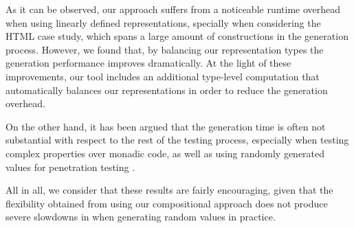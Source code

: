 As it can be observed, our approach suffers from a noticeable runtime overhead
when using linearly defined representations, specially when considering the HTML
case study, which spans a large amount of constructions in the generation
process.
%
However, we found that, by balancing our representation types the generation
performance improves dramatically.
%
At the light of these improvements, our tool includes an additional type-level
computation that automatically balances our representations in order to reduce
the generation overhead.


On the other hand, it has been argued that the generation time is often not
substantial with respect to the rest of the testing process, especially when
testing complex properties over monadic code, as well as using randomly
generated values for penetration testing
\cite{DBLP:conf/haskell/MistaRH18,grieco2017}.


All in all, we consider that these results are fairly encouraging, given that
the flexibility obtained from using our compositional approach does not produce
severe slowdowns in when generating random values in practice.


